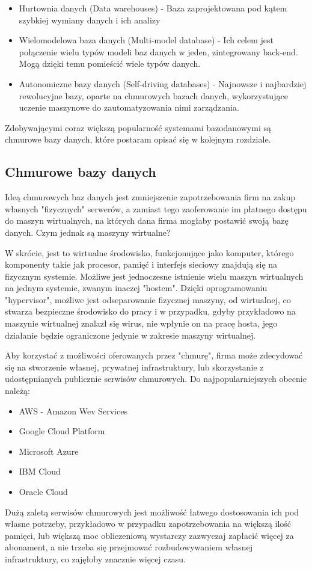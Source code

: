 \documentclass[12pt, a4paper]{article}
\begin{document}
\begin{sloppypar}
{{\begin{itemize}
      bazy danych, projektowane z myślą o dużej ilości transakcji wykonywanych pomiędzy
      wieloma użytkownikami. 
      \item Hurtownia danych (Data warehouses) - Baza zaprojektowana pod kątem
      szybkiej wymiany danych i ich analizy
      \item Wielomodelowa baza danych (Multi-model database) - Ich celem jest połączenie
      wielu typów modeli baz danych w jeden, zintegrowany back-end. Mogą dzięki temu
      pomieścić wiele typów danych.
      \item Autonomiczne bazy danych (Self-driving databases) - Najnowsze i najbardziej
      rewolucyjne bazy, oparte na chmurowych bazach danych, wykorzystujące uczenie
      maszynowe do zautomatyzowania nimi zarządzania.
    \end{itemize}

    Zdobywającymi coraz większą popularność systemami bazodanowymi są chmurowe bazy danych,
    które postaram opisać się w kolejnym rozdziale.
  }
  \subsection{Chmurowe bazy danych}
  {
    Ideą chmurowych baz danych jest zmniejszenie zapotrzebowania firm na zakup własnych
    "fizycznych" serwerów, a zamiast tego zaoferowanie im płatnego dostępu do maszyn
    wirtualnych, na których dana firma mogłaby postawić swoją bazę danych. Czym jednak
    są maszyny wirtualne? 
    
    W skrócie, jest to wirtualne środowisko, funkcjonujące jako
    komputer, którego komponenty takie jak procesor, pamięć i interfejs sieciowy
    znajdują się na fizycznym systemie. Możliwe jest jednoczesne istnienie wielu maszyn
    wirtualnych na jednym systemie, zwanym inaczej "hostem". Dzięki oprogramowaniu
    "hypervisor", możliwe jest odseparowanie fizycznej maszyny, od wirtualnej,
    co stwarza bezpieczne środowisko do pracy i w przypadku, gdyby przykładowo na
    maszynie wirtualnej znalazł się wirus, nie wpłynie on na pracę hosta, jego
    działanie będzie ograniczone jedynie w zakresie maszyny wirtualnej.

    Aby korzystać z możliwości oferowanych przez "chmurę", firma może zdecydować się
    na stworzenie własnej, prywatnej infrastruktury, lub skorzystanie z udostępnianych
    publicznie serwisów chmurowych. Do najpopularniejszych obecnie należą:
    \begin{itemize}
      \item AWS - Amazon Wev Services
      \item Google Cloud Platform
      \item Microsoft Azure
      \item IBM Cloud
      \item Oracle Cloud
    \end{itemize}
    Dużą zaletą serwisów chmurowych jest możliwość łatwego dostosowania ich pod własne
    potrzeby, przykładowo w przypadku zapotrzebowania na większą ilość pamięci, lub
    większą moc obliczeniową wystarczy zazwyczaj zapłacić więcej za abonament, a nie
    trzeba się przejmować rozbudowywaniem własnej infrastruktury, co zajęłoby znacznie
    więcej czasu.
  }
}
\end{sloppypar}
\end{document}

